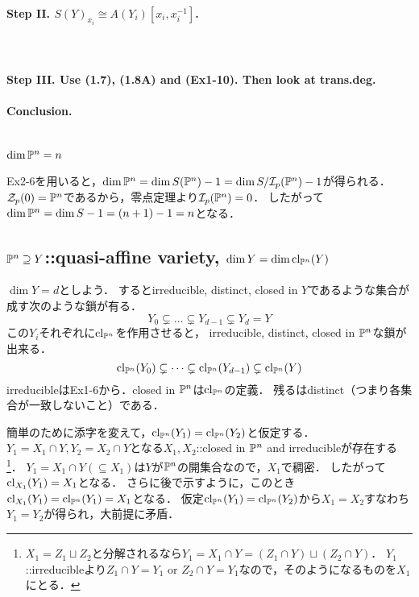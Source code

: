 \documentclass[a4paper]{jarticle}
\begin{document}
    \paragraph{Step II. $S(Y)_{x_i} \cong A(Y_i)[x_i, x_i^{-1}]$.} \mbox{} \\

    \paragraph{Step III. Use (1.7), (1.8A) and (Ex1-10). Then look at trans.deg.}

    \paragraph{Conclusion.}

\section{} %
    \subsection{$\dim \mathbb{P}^n=n$}
    Ex2-6を用いると，$\dim \mathbb{P}^n=\dim S(\mathbb{P}^n)-1=\dim S/\mathcal{I}_p(\mathbb{P}^n)-1$が得られる．
    $\mathcal{Z}_p(0)=\mathbb{P}^n$であるから，零点定理より$\mathcal{I}_p(\mathbb{P}^n)=0$．
    したがって$\dim \mathbb{P}^n=\dim S-1=(n+1)-1=n$となる．

    \subsection{$\mathbb{P}^n \supseteq Y$::quasi-affine variety, $\dim Y=\dim \operatorname{cl}_{\mathbb{P}^n}(Y)$}
    $\dim Y=d$としよう．
    するとirreducible, distinct, closed in $Y$であるような集合が成す次のような鎖が有る．
    \[ Y_0 \subsetneq \dots \subsetneq Y_{d-1} \subsetneq Y_d=Y \]
    この$Y_i$それぞれに$\operatorname{cl}_{\mathbb{P}^n}$を作用させると，
    irreducible, distinct, closed in $\mathbb{P}^n$な鎖が出来る．
    \[ \operatorname{cl}_{\mathbb{P}^n}(Y_0) \subsetneq \dots \subsetneq \operatorname{cl}_{\mathbb{P}^n}(Y_{d-1}) \subsetneq \operatorname{cl}_{\mathbb{P}^n}(Y) \]
    irreducibleはEx1-6から．closed in $\mathbb{P}^n$は$\operatorname{cl}_{\mathbb{P}^n}$の定義．
    残るはdistinct（つまり各集合が一致しないこと）である．
    
    簡単のために添字を変えて，$\operatorname{cl}_{\mathbb{P}^n}(Y_1)=\operatorname{cl}_{\mathbb{P}^n}(Y_2)$と仮定する．
    $Y_1=X_1 \cap Y, Y_2=X_2 \cap Y$となる$X_1, X_2$::closed in $\mathbb{P}^n$ and irreducibleが存在する
    \footnote{$X_1=Z_1 \sqcup Z_2$と分解されるなら$Y_1=X_1 \cap Y=(Z_1 \cap Y) \sqcup (Z_2 \cap Y)$．
    $Y_1$::irreducibleより$Z_1 \cap Y=Y_1$ or $Z_2 \cap Y=Y_1$なので，そのようになるものを$X_1$にとる．}．
    $Y_1=X_1 \cap Y( \subseteq X_1)$は$Y$が$\mathbb{P}^n$の開集合なので，$X_1$で稠密．
    したがって$\operatorname{cl}_{X_1}(Y_1)=X_1$となる．
    さらに後で示すように，このとき$\operatorname{cl}_{X_1}(Y_1)=\operatorname{cl}_{\mathbb{P}^n}(Y_1)=X_1$となる．
    仮定$\operatorname{cl}_{\mathbb{P}^n}(Y_1)=\operatorname{cl}_{\mathbb{P}^n}(Y_2)$から$X_1=X_2$すなわち$Y_1=Y_2$が得られ，大前提に矛盾．
\end{document}
